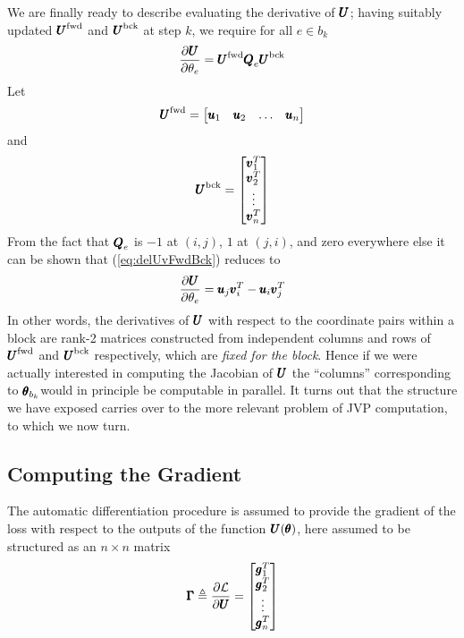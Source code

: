 \documentclass[superscriptaddress,floatfix]{article}
\begin{document}
We are finally ready to describe evaluating the derivative of ${\pmb{U}}$; 
having suitably updated ${\pmb{U}}^{\textrm{fwd}}$ and ${\pmb{U}}^{\textrm{bck}}$ at step $k$, 
we require for all $e \in b_k$
\begin{align}
  \frac{\partial{\pmb{U}}}{\partial\theta_e} = {\pmb{U}}^{\textrm{fwd}} {\pmb{Q}}_e {\pmb{U}}^{\textrm{bck}}
  \label{eq:delUvFwdBck}
\end{align}
Let
\[
{\pmb{U}}^{\textrm{fwd}} = \begin{bmatrix}
    {\pmb{u}}_1 & {\pmb{u}}_2 & \hdots & {\pmb{u}}_n
\end{bmatrix}
\]
and
\[
{\pmb{U}}^{\textrm{bck}} = \begin{bmatrix}
    {\pmb{v}}^T_1 \\
    {\pmb{v}}^T_2 \\
    \vdots \\
    {\pmb{v}}^T_n
\end{bmatrix}
\]
From the fact that ${\pmb{Q}}_e$ is $-1$ at $(i,j)$, $1$ at $(j,i)$, and
zero everywhere else it can be shown that (\ref{eq:delUvFwdBck})
reduces to
\begin{align}
  \frac{\partial{\pmb{U}}}{\partial\theta_e} = {\pmb{u}}_j{\pmb{v}}_i^T - {\pmb{u}}_i{\pmb{v}}_j^T
  \label{eq:delUvdelThetae}
\end{align}
In other words, the derivatives of ${\pmb{U}}$ with respect to the
coordinate pairs within a block are rank-2 matrices constructed from
independent columns and rows of ${\pmb{U}}^{\textrm{fwd}}$ and ${\pmb{U}}^{\textrm{bck}}$
respectively, which are \emph{fixed for the block}. Hence if we were
actually interested in computing the Jacobian of ${\pmb{U}}$ the ``columns''
corresponding to ${\pmb{\theta}}_{b_k}$would in principle be computable in
parallel. It turns out that the structure we have exposed carries over
to the more relevant problem of JVP computation, to which we now turn.

\subsection{Computing the Gradient}
\label{sec:JVP:ComputingGrad}

The automatic differentiation procedure is assumed to provide the
gradient of the loss with respect to the outputs of the function
${\pmb{U}}({\pmb{\theta}})$, here assumed to be structured as an $n \times n$
matrix
\[
{\pmb{\Gamma}} \triangleq \frac{\partial\mathcal{L}}{\partial{\pmb{U}}}  =
\begin{bmatrix}
  {\pmb{g}}_1^T \\
  {\pmb{g}}_2^T \\
  \vdots \\
  {\pmb{g}}_n^T
  \end{bmatrix}
\]
\end{document}
